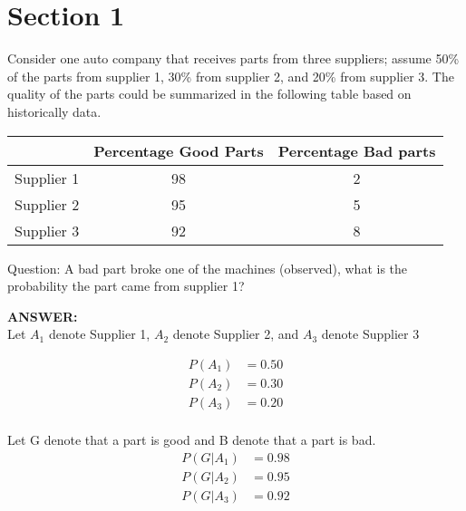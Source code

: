 \documentclass{report}
\begin{document}
\chapter{Section 1}

Consider  one auto  company that  receives  parts from  three suppliers;  assume  
50\% of  the parts from  supplier  1,  30\% from  supplier  2,  and 20\% from  supplier  3.  
The quality of  the parts could be  summarized  in  the following table based on  
historically  data.

\begin{center}
  \begin{tabular}{ | c | c | c | } 
    \hline
      & Percentage Good Parts & Percentage Bad parts \\ 
    \hline
    Supplier 1 & 98 & 2 \\ 
    \hline
    Supplier 2 & 95 & 5 \\ 
    \hline
    Supplier 3 & 92 & 8 \\ 
    \hline
  \end{tabular}
\end{center}

Question: A bad part  broke one of  the machines  (observed), what  is  the 
probability the part  came  from  supplier  1?

\hspace{1cm}

\textbf{ANSWER:} \\

Let $A_1$ denote Supplier 1, $A_2$ denote Supplier 2, and $A_3$ denote Supplier 3

\begin{equation} \label{eq3}
  \begin{split}
    P(A_1) & = 0.50 \\
    P(A_2) & = 0.30 \\
    P(A_3) & = 0.20 \\
  \end{split}
\end{equation}

Let G denote that a part is good and B denote that a part is bad. \\

\begin{equation} \label{eq3}
  \begin{split}
    P(G|A_1) & = 0.98 \\
    P(G|A_2) & = 0.95 \\
    P(G|A_3) & = 0.92 \\
  \end{split}
\end{equation}
\end{document}
